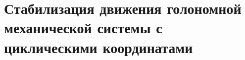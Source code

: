 \section{Стабилизация движения голономной механической системы с циклическими координатами} \label{p23}